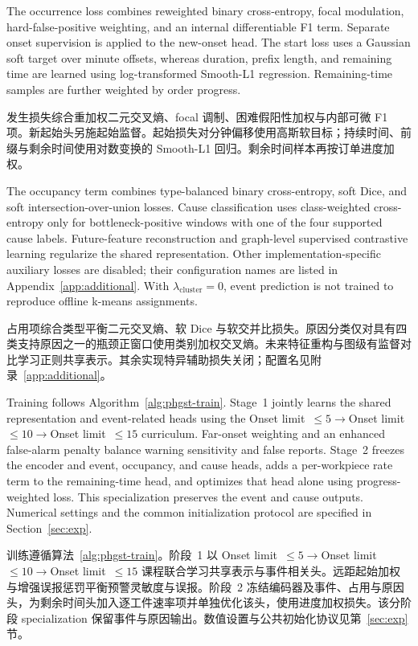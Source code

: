 \documentclass[a4paper,fleqn]{cas-dc}
\newcommand{\zhpara}[1]{%
  \par\begingroup\small\color{black!72}\noindent #1\par\endgroup}
\begin{document}
The occurrence loss combines reweighted binary cross-entropy, focal modulation, hard-false-positive weighting, and an internal differentiable F1 term. Separate onset supervision is applied to the new-onset head. The start loss uses a Gaussian soft target over minute offsets, whereas duration, prefix length, and remaining time are learned using log-transformed Smooth-L1 regression. Remaining-time samples are further weighted by order progress.

\zhpara{发生损失综合重加权二元交叉熵、focal 调制、困难假阳性加权与内部可微 F1 项。新起始头另施起始监督。起始损失对分钟偏移使用高斯软目标；持续时间、前缀与剩余时间使用对数变换的 Smooth-L1 回归。剩余时间样本再按订单进度加权。}


The occupancy term combines type-balanced binary cross-entropy, soft Dice, and soft intersection-over-union losses. Cause classification uses class-weighted cross-entropy only for bottleneck-positive windows with one of the four supported cause labels. Future-feature reconstruction and graph-level supervised contrastive learning regularize the shared representation. Other implementation-specific auxiliary losses are disabled; their configuration names are listed in Appendix~\ref{app:additional}. With $\lambda_{\mathrm{cluster}}=0$, event prediction is not trained to reproduce offline k-means assignments.

\zhpara{占用项综合类型平衡二元交叉熵、软 Dice 与软交并比损失。原因分类仅对具有四类支持原因之一的瓶颈正窗口使用类别加权交叉熵。未来特征重构与图级有监督对比学习正则共享表示。其余实现特异辅助损失关闭；配置名见附录~\ref{app:additional}。}


Training follows Algorithm~\ref{alg:phgst-train}. Stage~1 jointly learns the shared representation and event-related heads using the Onset limit~$\leq5\rightarrow$Onset limit~$\leq10\rightarrow$Onset limit~$\leq15$ curriculum. Far-onset weighting and an enhanced false-alarm penalty balance warning sensitivity and false reports. Stage~2 freezes the encoder and event, occupancy, and cause heads, adds a per-workpiece rate term to the remaining-time head, and optimizes that head alone using progress-weighted loss. This specialization preserves the event and cause outputs. Numerical settings and the common initialization protocol are specified in Section~\ref{sec:exp}.

\zhpara{训练遵循算法~\ref{alg:phgst-train}。阶段~1 以 Onset limit~$\leq5\rightarrow$Onset limit~$\leq10\rightarrow$Onset limit~$\leq15$ 课程联合学习共享表示与事件相关头。远距起始加权与增强误报惩罚平衡预警灵敏度与误报。阶段~2 冻结编码器及事件、占用与原因头，为剩余时间头加入逐工件速率项并单独优化该头，使用进度加权损失。该分阶段 specialization 保留事件与原因输出。数值设置与公共初始化协议见第~\ref{sec:exp} 节。}
\end{document}

